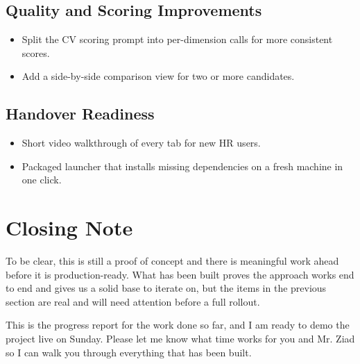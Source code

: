 \documentclass[12pt]{article}
\begin{document}
\subsection{Quality and Scoring Improvements}

\begin{itemize}
    \item Split the CV scoring prompt into per-dimension calls for more consistent scores.
    \item Add a side-by-side comparison view for two or more candidates.
\end{itemize}

\subsection{Handover Readiness}

\begin{itemize}
    \item Short video walkthrough of every tab for new HR users.
    \item Packaged launcher that installs missing dependencies on a fresh machine in one click.
\end{itemize}

\section{Closing Note}

To be clear, this is still a proof of concept and there is meaningful work ahead before it is production-ready. What has been built proves the approach works end to end and gives us a solid base to iterate on, but the items in the previous section are real and will need attention before a full rollout.

This is the progress report for the work done so far, and I am ready to demo the project live on Sunday. Please let me know what time works for you and Mr. Ziad so I can walk you through everything that has been built.
\end{document}
